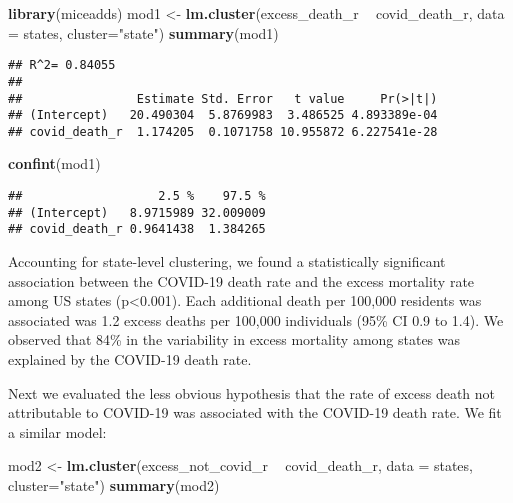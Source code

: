 \documentclass[
]{article}
\newenvironment{Shaded}{\begin{snugshade}}{\end{snugshade}}
\newcommand{\DataTypeTok}[1]{\textcolor[rgb]{0.13,0.29,0.53}{#1}}
\newcommand{\KeywordTok}[1]{\textcolor[rgb]{0.13,0.29,0.53}{\textbf{#1}}}
\newcommand{\NormalTok}[1]{#1}
\newcommand{\OperatorTok}[1]{\textcolor[rgb]{0.81,0.36,0.00}{\textbf{#1}}}
\newcommand{\StringTok}[1]{\textcolor[rgb]{0.31,0.60,0.02}{#1}}
\begin{document}
\begin{Shaded}
\begin{Highlighting}[]
\KeywordTok{library}\NormalTok{(miceadds)}
\NormalTok{mod1 <-}\StringTok{ }\KeywordTok{lm.cluster}\NormalTok{(excess_death_r }\OperatorTok{~}\StringTok{ }\NormalTok{covid_death_r, }\DataTypeTok{data =}\NormalTok{ states, }\DataTypeTok{cluster=}\StringTok{"state"}\NormalTok{)}
\KeywordTok{summary}\NormalTok{(mod1) }
\end{Highlighting}
\end{Shaded}

\begin{verbatim}
## R^2= 0.84055 
## 
##                Estimate Std. Error   t value     Pr(>|t|)
## (Intercept)   20.490304  5.8769983  3.486525 4.893389e-04
## covid_death_r  1.174205  0.1071758 10.955872 6.227541e-28
\end{verbatim}

\begin{Shaded}
\begin{Highlighting}[]
\KeywordTok{confint}\NormalTok{(mod1) }
\end{Highlighting}
\end{Shaded}

\begin{verbatim}
##                   2.5 %    97.5 %
## (Intercept)   8.9715989 32.009009
## covid_death_r 0.9641438  1.384265
\end{verbatim}

Accounting for state-level clustering, we found a statistically
significant association between the COVID-19 death rate and the excess
mortality rate among US states (p\textless0.001). Each additional death
per 100,000 residents was associated was 1.2 excess deaths per 100,000
individuals (95\% CI 0.9 to 1.4). We observed that 84\% in the
variability in excess mortality among states was explained by the
COVID-19 death rate.

Next we evaluated the less obvious hypothesis that the rate of excess
death not attributable to COVID-19 was associated with the COVID-19
death rate. We fit a similar model:

\begin{Shaded}
\begin{Highlighting}[]
\NormalTok{mod2 <-}\StringTok{ }\KeywordTok{lm.cluster}\NormalTok{(excess_not_covid_r }\OperatorTok{~}\StringTok{ }\NormalTok{covid_death_r, }\DataTypeTok{data =}\NormalTok{ states, }\DataTypeTok{cluster=}\StringTok{"state"}\NormalTok{)}
\KeywordTok{summary}\NormalTok{(mod2) }
\end{Highlighting}
\end{Shaded}
\end{document}
